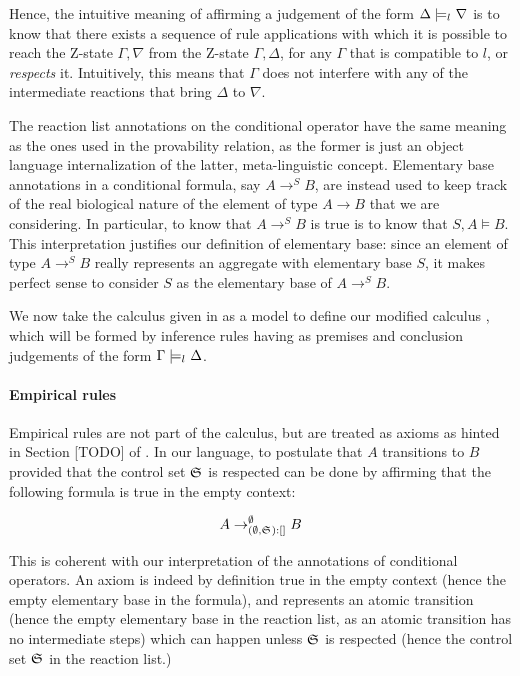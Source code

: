 Hence, the intuitive meaning of affirming a judgement of the form
$\Delta \models_{l_{}} \nabla$ is to know that there exists a sequence
of \eznd{} rule applications with which it is possible to reach the Z-state
$\Gamma, \nabla$ from the Z-state $\Gamma, \Delta$, for any $\Gamma$ that is
compatible to $l$, or \emph{respects} it. Intuitively, this means that $\Gamma$
does not interfere with any of the intermediate reactions that bring $\Delta$ to
$\nabla$.

The reaction list annotations on the conditional operator have the same meaning
as the ones used in the provability relation, as the former is just an object
language internalization of the latter, meta-linguistic concept.  Elementary
base annotations in a conditional formula, say $A \rightarrow^S B$, are instead
used to keep track of the real biological nature of the element of type
$A \rightarrow B$ that we are considering.
In particular, to know that $A \rightarrow^S B$ is true is to know that $S, A
\models B$. This interpretation justifies our definition of elementary base:
since an element of type $A \rightarrow^S B$ really represents an aggregate with
elementary base $S$, it makes perfect sense to consider $S$ as the elementary
base of $A \rightarrow^S B$.

We now take the calculus \znd{} given in \cite{adding-logic} as a model to define our
modified calculus \eznd{}, which will be formed by inference rules having as
premises and conclusion judgements of the form
$\Gamma \models_{l_{}} \Delta$.

\paragraph{Empirical rules}

Empirical rules are not part of the calculus, but are treated as axioms as
hinted in Section [TODO] of \cite{adding-logic}. In our language, to postulate
that $A$ transitions to $B$ provided that the control set $\mathfrak{S}_{}$ is
respected can be done by affirming that the following formula is true in the
empty context:

\[
  A \rightarrow_{(\emptyset, \mathfrak{S}_{}):[]}^\emptyset B
\]

This is coherent with our interpretation of the annotations of conditional
operators. An axiom is indeed by definition true in the empty context (hence the
empty elementary base in the formula), and represents an atomic transition
(hence the empty elementary base in the reaction list, as an atomic transition
has no intermediate steps) which can happen unless $\mathfrak{S}_{}$ is respected
(hence the control set $\mathfrak{S}_{}$ in the reaction list.)

